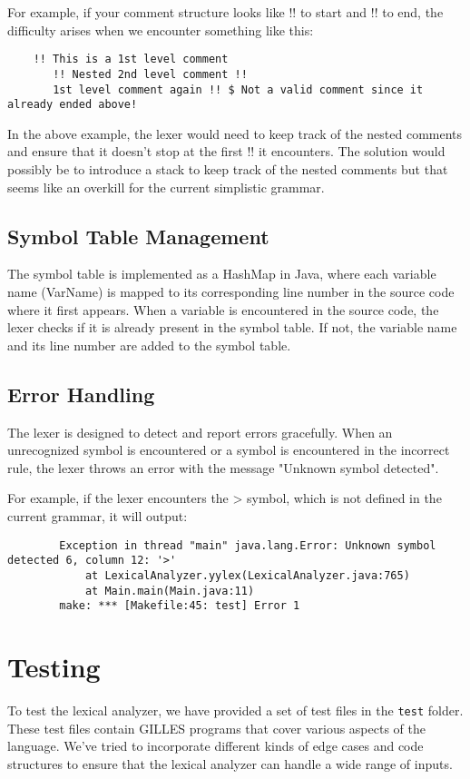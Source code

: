 \documentclass{article}
\begin{document}
	For example, if your comment structure looks like !! to start and !! to end, the difficulty arises when we encounter something like this:

	\begin{verbatim}
	!! This is a 1st level comment
	   !! Nested 2nd level comment !!
	   1st level comment again !! $ Not a valid comment since it already ended above!
	\end{verbatim}

	In the above example, the lexer would need to keep track of the nested comments and ensure that it doesn't stop at the first !! it encounters. The solution would possibly be to
	introduce a stack to keep track of the nested comments but that seems like an overkill for the current simplistic grammar.\\

	\subsection{Symbol Table Management}

	The symbol table is implemented as a HashMap in Java, where each variable name (VarName) is mapped to its corresponding line number in the source code where it first appears.
	When a variable is encountered in the source code, the lexer checks if it is already present in the symbol table. If not, the variable name and its line number are added to the symbol table.

	\subsection{Error Handling}

	The lexer is designed to detect and report errors gracefully. When an unrecognized symbol is encountered or a symbol is encountered in the incorrect rule, the lexer throws an error with the message "Unknown symbol detected".

	For example, if the lexer encounters the > symbol, which is not defined in the current grammar, it will output:

	\begin{verbatim}
		Exception in thread "main" java.lang.Error: Unknown symbol detected 6, column 12: '>'
			at LexicalAnalyzer.yylex(LexicalAnalyzer.java:765)
			at Main.main(Main.java:11)
		make: *** [Makefile:45: test] Error 1
	\end{verbatim}


	\section{Testing}
	To test the lexical analyzer, we have provided a set of test files in the \texttt{test} folder. These test files contain GILLES programs that cover various aspects of the language.
	We've tried to incorporate different kinds of edge cases and code structures to ensure that the lexical analyzer can handle a wide range of inputs.
\end{document}
